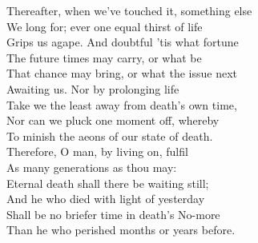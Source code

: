 Thereafter, when we've touched it, something else\\
We long for; ever one equal thirst of life\\
Grips us agape. And doubtful 'tis what fortune\\
The future times may carry, or what be\\
That chance may bring, or what the issue next\\
Awaiting us. Nor by prolonging life\\
Take we the least away from death's own time,\\
Nor can we pluck one moment off, whereby\\
To minish the aeons of our state of death.\\
Therefore, O man, by living on, fulfil\\
As many generations as thou may:\\
Eternal death shall there be waiting still;\\
And he who died with light of yesterday\\
Shall be no briefer time in death's No-more\\
Than he who perished months or years before.



